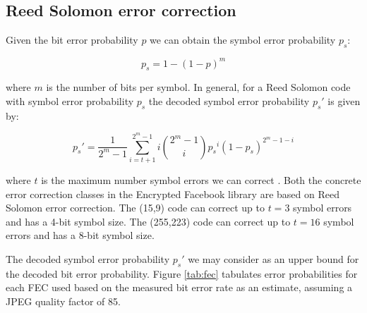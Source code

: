 \subsection{Reed Solomon error correction}

Given the bit error probability $p$ we can obtain the symbol error probability $p_s$:

\begin{equation}
    p_s = 1 - (1-p)^m
\end{equation}

where $m$ is the number of bits per symbol. In general, for a Reed Solomon code with symbol error probability $p_s$ the decoded symbol error probability $p_s'$ is given by:

\begin{equation}
    p_s' = \frac{1}{2^m -1} \sum^{2^m - 1}_{i = t+1} i {{2^m - 1}\choose{i}} {p_s}^i (1-{p_s})^{2^m - 1 - i}
\end{equation}

where $t$ is the maximum number symbol errors we can correct \cite{rsfec-decode}. Both the concrete error correction classes in the Encrypted Facebook library are based on Reed Solomon error correction. The (15,9) code can correct up to $t=3$ symbol errors and has a 4-bit symbol size. The (255,223) code can correct up to $t=16$ symbol errors and has a 8-bit symbol size.

The decoded symbol error probability $p_s'$ we may consider as an upper bound for the decoded bit error probability. Figure \ref{tab:fec} tabulates error probabilities for each FEC used based on the measured bit error rate as an estimate, assuming a JPEG quality factor of 85.

